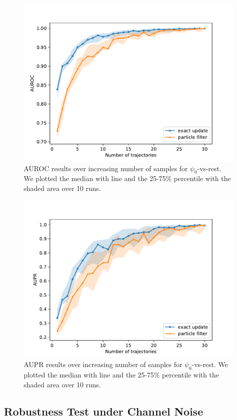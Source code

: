 \begin{figure}[H]
	\begin{center}
		\includegraphics[width=.75\textwidth]{figures/roc_analysis/AUROC_perc_0}
		\caption[AUROC results over increasing number of samples]{AUROC results over increasing number of samples for $ \psi_0 $-vs-rest. We plotted the median with line and the 25-75\% percentile with the shaded area over 10 runs.}
		\label{fig:AUROC_class0}
	\end{center}
\end{figure}
\begin{figure}[H]
	\begin{center}
		\includegraphics[width=.75\textwidth]{figures/roc_analysis/AUPR_perc_0}
		\caption[AUPR results over increasing number of samples]{AUPR results over increasing number of samples for $ \psi_0 $-vs-rest. We plotted the median with line and the 25-75\% percentile with the shaded area over 10 runs.}
		\label{fig:AUPR_class0}
	\end{center}
\end{figure}
\subsection{Robustness Test under Channel Noise}